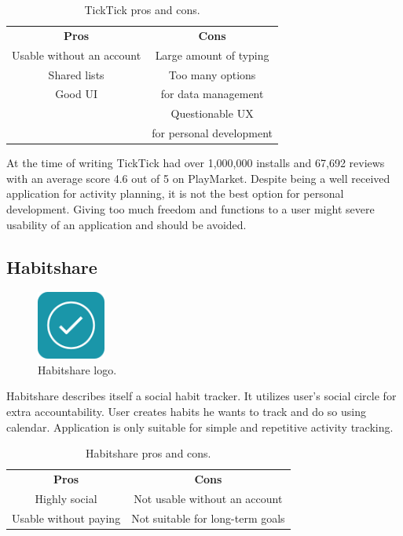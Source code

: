 \begin{table}[h!]
    \centering
    \begin{ctucolortab}
        \begin{tabular}{cc}
            \bfseries Pros & \bfseries Cons\\\Midrule
            Usable without an account & Large amount of typing \\
            Shared lists & Too many options \\
            Good UI & for data management \\
             & Questionable UX \\
             & for personal development \\
        \end{tabular}
    \end{ctucolortab}
    \caption{TickTick pros and cons.}\label{tab:ticktick-pros-cons}
\end{table}

At the time of writing TickTick had over 1,000,000 installs and 67,692 reviews with an average score 4.6 out of 5 on PlayMarket.
Despite being a well received application for activity planning, it is not the best option for personal development.
Giving too much freedom and functions to a user might severe usability of an application and should be avoided.


\subsection{Habitshare}\label{subsec:habitshare}

\begin{figure}[h!]
    \includegraphics[width=0.20\textwidth]{images/habitshare-logo.png}
    \caption{Habitshare logo.\cite{habitshare-logo}}
    \label{fig:habitshare-logo}
\end{figure}

Habitshare describes itself a social habit tracker.
It utilizes user's social circle for extra accountability.
User creates habits he wants to track and do so using calendar.
Application is only suitable for simple and repetitive activity tracking.

\begin{table}[h!]
    \centering
    \begin{ctucolortab}
        \begin{tabular}{cc}
            \bfseries Pros & \bfseries Cons\\\Midrule
            Highly social & Not usable without an account\\
            Usable without paying & Not suitable for long-term goals\\
        \end{tabular}
    \end{ctucolortab}
    \caption{Habitshare pros and cons.}\label{tab:habitshare-pros-cons}
\end{table}

